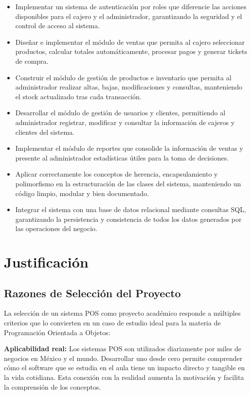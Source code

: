 \documentclass[12pt,a4paper]{report}
\begin{document}
\begin{itemize}
    \item Implementar un sistema de autenticación por roles que diferencie las acciones disponibles para el cajero y el administrador, garantizando la seguridad y el control de acceso al sistema.
    \item Diseñar e implementar el módulo de ventas que permita al cajero seleccionar productos, calcular totales automáticamente, procesar pagos y generar tickets de compra.
    \item Construir el módulo de gestión de productos e inventario que permita al administrador realizar altas, bajas, modificaciones y consultas, manteniendo el stock actualizado tras cada transacción.
    \item Desarrollar el módulo de gestión de usuarios y clientes, permitiendo al administrador registrar, modificar y consultar la información de cajeros y clientes del sistema.
    \item Implementar el módulo de reportes que consolide la información de ventas y presente al administrador estadísticas útiles para la toma de decisiones.
    \item Aplicar correctamente los conceptos de herencia, encapsulamiento y polimorfismo en la estructuración de las clases del sistema, manteniendo un código limpio, modular y bien documentado.
    \item Integrar el sistema con una base de datos relacional mediante consultas SQL, garantizando la persistencia y consistencia de todos los datos generados por las operaciones del negocio.
\end{itemize}

\chapter{Justificación}

\section{Razones de Selección del Proyecto}

La selección de un sistema POS como proyecto académico responde a múltiples criterios que lo convierten en un caso de estudio ideal para la materia de Programación Orientada a Objetos:

\textbf{Aplicabilidad real:} Los sistemas POS son utilizados diariamente por miles de negocios en México y el mundo. Desarrollar uno desde cero permite comprender cómo el software que se estudia en el aula tiene un impacto directo y tangible en la vida cotidiana. Esta conexión con la realidad aumenta la motivación y facilita la comprensión de los conceptos.
\end{document}
